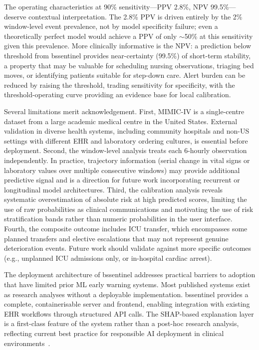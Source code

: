 \documentclass[12pt]{article}
\begin{document}
The operating characteristics at 90\% sensitivity---PPV 2.8\%, NPV
99.5\%---deserve contextual interpretation. The 2.8\% PPV is driven entirely
by the 2\% window-level event prevalence, not by model specificity failure;
even a theoretically perfect model would achieve a PPV of only $\sim$50\%
at this sensitivity given this prevalence. More clinically informative is
the NPV: a prediction below threshold from bssentinel provides near-certainty
(99.5\%) of short-term stability, a property that may be valuable for
scheduling nursing observations, triaging bed moves, or identifying
patients suitable for step-down care. Alert burden can be reduced by raising
the threshold, trading sensitivity for specificity, with the threshold-operating
curve providing an evidence base for local calibration.

Several limitations merit acknowledgement. First, MIMIC-IV is a single-centre
dataset from a large academic medical centre in the United States. External
validation in diverse health systems, including community hospitals and
non-US settings with different EHR and laboratory ordering cultures, is
essential before deployment. Second, the window-level analysis treats each
6-hourly observation independently. In practice, trajectory information
(serial change in vital signs or laboratory values over multiple consecutive
windows) may provide additional predictive signal and is a direction for
future work incorporating recurrent or longitudinal model architectures.
Third, the calibration analysis reveals systematic overestimation of absolute
risk at high predicted scores, limiting the use of raw probabilities as
clinical communications and motivating the use of risk stratification bands
rather than numeric probabilities in the user interface. Fourth, the composite
outcome includes ICU transfer, which encompasses some planned transfers and
elective escalations that may not represent genuine deterioration events.
Future work should validate against more specific outcomes (e.g., unplanned
ICU admissions only, or in-hospital cardiac arrest).

The deployment architecture of bssentinel addresses practical barriers to
adoption that have limited prior ML early warning systems. Most published
systems exist as research analyses without a deployable implementation.
bssentinel provides a complete, containerisable server and frontend, enabling
integration with existing EHR workflows through structured API calls. The
SHAP-based explanation layer is a first-class feature of the system rather
than a post-hoc research analysis, reflecting current best practice for
responsible AI deployment in clinical environments~\cite{yang2023_shap,
lundberg2017}.
\end{document}
